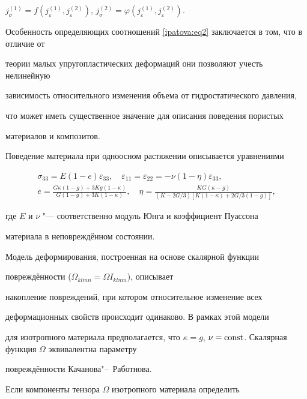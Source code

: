 $j_\sigma^{(1)} =f (j_\varepsilon^{(1)},j_\varepsilon^{(2)} )$, $j_\sigma

^{(2)} =\varphi (j_\varepsilon ^{(1)},j_\varepsilon ^{(2)} )$.



Особенность определяющих соотношений \eqref{ipatova:eq2} заключается в том, что в отличие от

теории малых упругопластических деформаций они позволяют учесть нелинейную

зависимость относительного изменения объема от гидростатического давления,

что может иметь существенное значение для описания поведения пористых

материалов и композитов.



Поведение материала при одноосном растяжении описывается уравнениями

\begin{gather*}

\sigma _{33} =E (1-e) \varepsilon _{33}, \quad \varepsilon_{11} =\varepsilon _{22} =-\nu (1-\eta)

\varepsilon _{33}, \\

e=\frac{G\kappa (1-g)+3Kg(1-\kappa)}{G(1-g)+3K(1-\kappa)}, \quad \eta =\frac{KG (\kappa -g)}

{( K-2G/3) [ K (1-\kappa) + 2G/3(1-g)]},

\end{gather*}

где $E$ и $\nu $ "--- соответственно модуль Юнга и коэффициент Пуассона

материала в неповреждённом состоянии.



Модель деформирования, построенная на основе скалярной функции

повреждённости ($\Omega _{klmn} =\Omega I_{klmn}$), описывает

накопление повреждений, при котором относительное изменение всех

деформационных свойств происходит одинаково. В рамках этой модели

для изотропного материала предполагается, что $\kappa =g$, $\nu

={\rm const}$. Скалярная функция $\Omega $ эквивалентна параметру

повреждённости Качанова"--~Работнова.



Если компоненты тензора $\Omega $ изотропного материала определить

